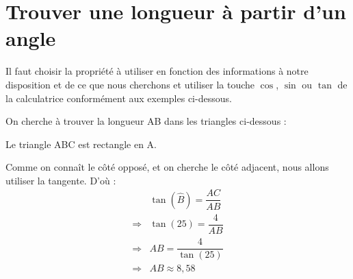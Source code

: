 \section{Trouver une longueur à partir d'un angle}

Il faut choisir la propriété à utiliser en fonction des informations à notre disposition et de ce que nous cherchons et utiliser la touche $\cos$, $\sin$ ou $\tan$ de la calculatrice conformément aux exemples ci-dessous.


On cherche à trouver la longueur AB dans les triangles ci-dessous :

\begin{minipage}[b]{0.45\textwidth}
\begin{center}
\end{center}   

Le triangle ABC est rectangle en A.

Comme on connaît le côté opposé, et on cherche le côté adjacent, nous allons utiliser la tangente. D'où : 
\begin{align*}
    &\tan (\widehat{B})=\dfrac{AC}{AB}\\
    \Rightarrow &\tan (25)=\dfrac{4}{AB}\\
    \Rightarrow & AB = \dfrac{4}{\tan(25)}\\
    \Rightarrow & AB \approx 8,58
\end{align*}
\end{minipage}
\hfil \vrule \hfil
